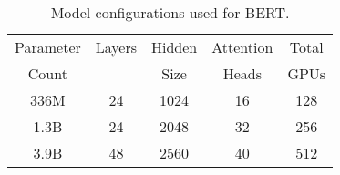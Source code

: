 \documentclass{article}
\begin{document}
\begin{table}
\footnotesize
\begin{center}
\caption{Model configurations used for BERT.}
\label{tab:bert_model_size}
\begin{tabular}{c|c|c|c|c} \hline \hline
Parameter & Layers & Hidden & Attention & Total \\
Count     &        & Size   & Heads     & GPUs  \\ \hline
336M      & 24     & 1024   & 16        & 128   \\ 
1.3B      & 24     & 2048   & 32        & 256   \\ 
3.9B      & 48     & 2560   & 40        & 512   \\ \hline 
\end{tabular}
\end{center}
\end{table}
\end{document}
